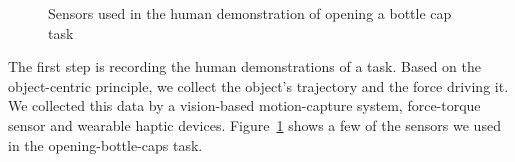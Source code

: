 \begin{figure}
  \centering
    \caption{\scriptsize{Sensors used in the human demonstration of
        opening a bottle cap task}
      }
  \label{fig:devices}
\end{figure}

The first step is recording the human demonstrations of a task. Based on the object-centric principle, we collect the object's trajectory and the force driving it. %
We collected this data by a vision-based motion-capture system,
force-torque sensor and wearable haptic
devices. Figure~\ref{fig:devices} shows a few of the sensors we used
in the opening-bottle-caps task. %



